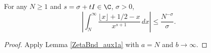 \begin{lemma}
\label{ZetaBnd_aux1b}
\leanok
For any $N\ge1$ and $s = \sigma + tI \in \C$, $\sigma > 0$,
  $$
  \left| \int_N^\infty \frac{\lfloor x\rfloor + 1/2 - x}{x^{s+1}} \, dx \right|
  \le \frac{N^{-\sigma}}{\sigma}.
  $$
\end{lemma}
\begin{proof}
\leanok
Apply Lemma \ref{ZetaBnd_aux1a} with $a=N$ and $b\to \infty$.
\end{proof}
